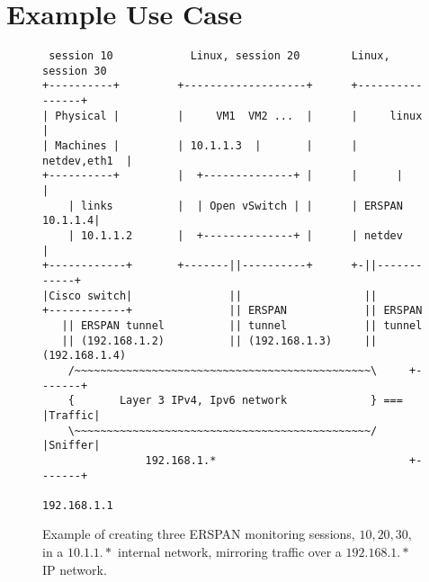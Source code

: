 \documentclass[10pt]{sigplanconf}
\newcommand{\mycomment}[1]{}
\begin{document}
\mycomment{
\subsection{Open vSwitch Kernel Module}
Similar to other tunnel types such as VxLAN and Geneve,
Open vSwitch kernel module, openvswitch.ko, configures the Linux
ERSPAN tunnel by getting the binary tunnel configuration blob from
its userspace daemon, ovs-vswitchd, verifies its parameters, and
copies the tunnel data into flow key (struct sw\_flow\_key).
As a result, the tunnel configuration is per-flow key set-up.

When OVS kernel module process 

commit fc1372f89ffe1f58b589643b75f679e452350703
Author: William Tu <u9012063@gmail.com>
Date:   Thu Jan 25 13:20:11 2018 -0800

    openvswitch: add erspan version I and II support
    
    The patch adds support for openvswitch to configure erspan
    to uapi as a binary blob to support all ERSPAN v1 and v2's
    fields.  Note that Previous commit "openvswitch: Add erspan tunnel
    support." was reverted since it does not design properly.
    

}
\section{Example Use Case}
\begin{figure}
{\scriptsize
\begin{verbatim}
 session 10            Linux, session 20        Linux, session 30
+----------+         +-------------------+      +----------------+
| Physical |         |     VM1  VM2 ...  |      |     linux      |
| Machines |         | 10.1.1.3  |       |      |   netdev,eth1  |
+----------+         |  +--------------+ |      |      |         |
    | links          |  | Open vSwitch | |      | ERSPAN 10.1.1.4|
    | 10.1.1.2       |  +--------------+ |      | netdev         |
+------------+       +-------||----------+      +-||------------+ 
|Cisco switch|               ||                   ||
+------------+               || ERSPAN            || ERSPAN
   || ERSPAN tunnel          || tunnel            || tunnel
   || (192.168.1.2)          || (192.168.1.3)     || (192.168.1.4)
    /~~~~~~~~~~~~~~~~~~~~~~~~~~~~~~~~~~~~~~~~~~~~~~\     +-------+ 
    {       Layer 3 IPv4, Ipv6 network             } === |Traffic|
    \~~~~~~~~~~~~~~~~~~~~~~~~~~~~~~~~~~~~~~~~~~~~~~/     |Sniffer|
                192.168.1.*                              +-------+
                                                        192.168.1.1
\end{verbatim}   
}
\vspace{-0.5em}
\caption{Example of creating three ERSPAN monitoring sessions, $10, 20, 30$,
in a $10.1.1.*$ internal network, mirroring traffic over a $192.168.1.*$ IP network.}
\label{example}
\vspace{-1.0em}
\end{figure}
\end{document}
